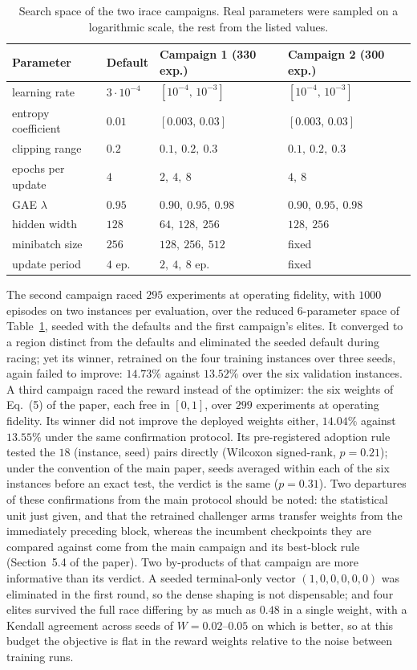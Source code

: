 \documentclass[preprint,authoryear,12pt]{elsarticle}
\begin{document}
\begin{table}[t]
\centering\small
\caption{Search space of the two irace campaigns. Real parameters were
sampled on a logarithmic scale, the rest from the listed values.}
\label{sup:tab-irace}
\setlength{\tabcolsep}{5pt}
\begin{tabular}{llll}
\toprule
Parameter & Default & Campaign 1 (330 exp.) & Campaign 2 (300 exp.) \\
\midrule
learning rate & $3\cdot10^{-4}$ & $[10^{-4},\,10^{-3}]$ &
  $[10^{-4},\,10^{-3}]$ \\
entropy coefficient & $0.01$ & $[0.003,\,0.03]$ & $[0.003,\,0.03]$ \\
clipping range & $0.2$ & $0.1,\ 0.2,\ 0.3$ & $0.1,\ 0.2,\ 0.3$ \\
epochs per update & $4$ & $2,\ 4,\ 8$ & $4,\ 8$ \\
GAE $\lambda$ & $0.95$ & $0.90,\ 0.95,\ 0.98$ & $0.90,\ 0.95,\ 0.98$ \\
hidden width & $128$ & $64,\ 128,\ 256$ & $128,\ 256$ \\
minibatch size & $256$ & $128,\ 256,\ 512$ & fixed \\
update period & $4$ ep. & $2,\ 4,\ 8$ ep. & fixed \\
\bottomrule
\end{tabular}
\end{table}

The second campaign raced $295$ experiments at operating fidelity,
with $1000$ episodes on two instances per evaluation, over the
reduced $6$-parameter space of Table~\ref{sup:tab-irace}, seeded with
the defaults and the first campaign's elites. It converged to a
region distinct from the defaults and eliminated the seeded default
during racing; yet its winner, retrained on the four training
instances over three seeds, again failed to improve: $14.73\%$
against $13.52\%$ over the six validation instances.
A third campaign raced the reward instead of the optimizer: the six
weights of Eq.~(5) of the paper, each free in $[0,1]$, over $299$
experiments at operating fidelity. Its winner did not improve the
deployed weights either, $14.04\%$ against $13.55\%$ under the same
confirmation protocol. Its pre-registered adoption rule tested the
$18$ (instance, seed) pairs directly (Wilcoxon signed-rank,
$p=0.21$); under the convention of the main paper, seeds averaged
within each of the six instances before an exact test, the verdict is
the same ($p=0.31$). Two departures of these confirmations from the
main protocol should be noted: the statistical unit just given, and
that the retrained challenger arms transfer weights from the
immediately preceding block, whereas the incumbent checkpoints they
are compared against come from the main campaign and its best-block
rule (Section~5.4 of the paper). Two
by-products of that campaign are more informative than its verdict. A
seeded terminal-only vector $(1,0,0,0,0,0)$ was eliminated in the
first round, so the dense shaping is not dispensable; and four elites
survived the full race differing by as much as $0.48$ in a single
weight, with a Kendall agreement across seeds of $W=0.02$--$0.05$ on
which is better, so at this budget the objective is flat in the
reward weights relative to the noise between training runs.
\end{document}
